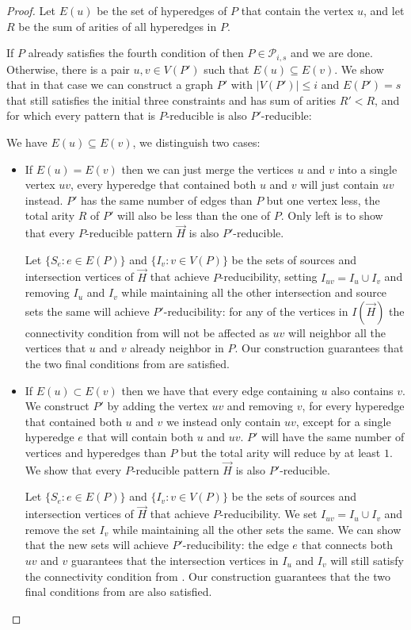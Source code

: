 \documentclass[a4paper,UKenglish,cleveref, autoref, numberwithinsect, thm-restate]{lipics-v2021}
\newcommand{\reducible}[1]{${#1}$-reducible}
\begin{document}
	\begin{proof}
		Let $E(u)$ be the set of hyperedges of $P$ that contain the vertex $u$, and let $R$ be the sum of arities of all hyperedges in $P$.
		
		If $P$ already satisfies the fourth condition of  then $P \in \mathcal{P}_{i,s}$ and we are done.  Otherwise, there is a pair $u,v \in V(P')$ such that $E(u) \subseteq E(v)$. We show that in that case we can construct a graph $P'$ with $|V(P')| \leq i$ and $E(P') = s$ that still satisfies the initial three constraints and has sum of arities $R' < R$, and for which every pattern that is \reducible{P} is also \reducible{P'}:
		
		We have $E(u) \subseteq E(v)$, we distinguish two cases:
		\begin{itemize}
			\item If $E(u) = E(v)$ then we can just merge the vertices $u$ and $v$ into a single vertex $uv$, every hyperedge that contained both $u$ and $v$ will just contain $uv$ instead. $P'$ has the same number of edges than $P$ but one vertex less, the total arity $R$ of $P'$ will also be less than the one of $P$. Only left is to show that every \reducible{P} pattern $\vec{H}$ is also \reducible{P'}. 
			
			Let $\{S_e : e \in E(P)\}$ and $\{I_v : v \in V(P)\}$ be the sets of sources and intersection vertices of $\vec{H}$ that achieve $P$-reducibility, setting $I_{uv} = I_u \cup I_v$ and removing $I_u$ and $I_v$ while maintaining all the other intersection and source sets the same will achieve $P'$-reducibility: for any of the vertices in $I(\vec{H})$ the connectivity condition from  will not be affected as $uv$ will neighbor all the vertices that $u$ and $v$ already neighbor in $P$. Our construction guarantees that the two final conditions from  are satisfied.
			
			\item If $E(u) \subset E(v)$ then we have that every edge containing $u$ also contains $v$. We construct $P'$ by adding the vertex $uv$ and removing $v$, for every hyperedge that contained both $u$ and $v$ we instead only contain $uv$, except for a single hyperedge $e$ that will contain both $u$ and $uv$. $P'$ will have the same number of vertices and hyperedges than $P$ but the total arity will reduce by at least $1$. We show that every \reducible{P} pattern $\vec{H}$ is also \reducible{P'}. 
			
			Let $\{S_e : e \in E(P)\}$ and $\{I_v : v \in V(P)\}$ be the sets of sources and intersection vertices of $\vec{H}$ that achieve $P$-reducibility. We set $I_{uv} = I_u \cup I_v$ and remove the set $I_v$ while maintaining all the other sets the same. We can show that the new sets will achieve $P'$-reducibility: the edge $e$ that connects both $uv$ and $v$ guarantees that the intersection vertices in $I_u$ and $I_v$ will still satisfy the connectivity condition from . Our construction guarantees that the two final conditions from  are also satisfied.
		\end{itemize}
		

\end{proof}
\end{document}
